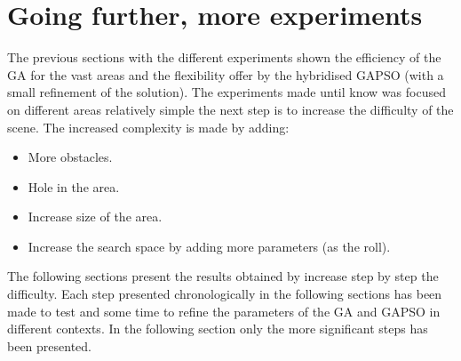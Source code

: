    
		
\section{Going further, more experiments }\label{sec:GoingFurtherWaypointPose}

The previous sections with the different experiments shown the efficiency of the GA for the vast areas and the flexibility offer by the hybridised GAPSO (with a small refinement of the solution). The experiments made until know was focused on different areas relatively simple the next step is to increase the difficulty of the scene. The increased complexity is made by adding: 
\begin{itemize}
\item More obstacles.
\item Hole in the area.
\item Increase size of the area.
\item Increase the search space by adding more parameters (as the roll). 
\end{itemize} 
The following sections present the results obtained by increase step by step the difficulty. Each step presented chronologically in the following sections has been made to test and some time to refine the parameters of the GA and GAPSO in different contexts. In the following section only the more significant steps has been presented.

